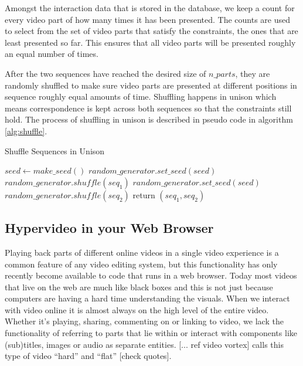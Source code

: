 Amongst the interaction data that is stored in the database, we keep a count for every video part of how many times it has been presented. The counts are used to select from the set of video parts that satisfy the constraints, the ones that are least presented so far. This ensures that all video parts will be presented roughly an equal number of times.

After the two sequences have reached the desired size of $n\_parts$, they are randomly shuffled to make sure video parts are presented at different positions in sequence roughly equal amounts of time. Shuffling happens in unison which means correspondence is kept across both sequences so that the constraints still hold. The process of shuffling in unison is described in pseudo code in algorithm \ref{alg:shuffle}.

\begin{algorithm}
  \caption{Shuffle Sequences in Unison}
  \begin{algorithmic}[1]
      \State $seed \gets make\_seed()$ 
      \State $random\_generator.set\_seed(seed)$ 
      \State $random\_generator.shuffle(seq_1)$ 
      \State $random\_generator.set\_seed(seed)$ 
      \State $random\_generator.shuffle(seq_2)$ 
      \State return $(seq_1, seq_2)$
    \EndProcedure
  \end{algorithmic}
  \label{alg:shuffle}
\end{algorithm}

\subsection{Hypervideo in your Web Browser}

Playing back parts of different online videos in a single video experience is a common feature of any video editing system, but this functionality has only recently become available to code that runs in a web browser. Today most videos that live on the web are much like black boxes and this is not just because computers are having a hard time understanding the visuals. When we interact with video online it is almost always on the high level of the entire video. Whether it's playing, sharing, commenting on or linking to video, we lack the functionality of referring to parts that lie within or interact with components like (sub)titles, images or audio as separate entities. [... ref video vortex] calls this type of video ``hard'' and ``flat'' [check quotes].

